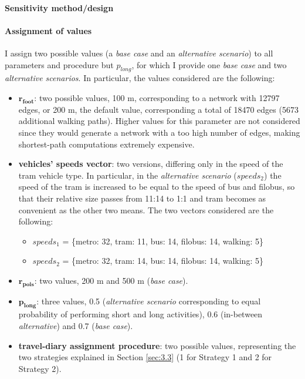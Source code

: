 \paragraph{Sensitivity method/design}


\paragraph{Assignment of values}
I assign two possible values (a \textit{base case} and an \textit{alternative scenario}) to all parameters and procedure but $p_{long}$, for which I provide one \textit{base case} and two \textit{alternative scenarios}. In particular, the values considered are the following:
\begin{itemize}
    \item $\mathbf{r_{foot}}$: two possible values, 100 m, corresponding to a network with 12797 edges, or 200 m, the default value, corresponding a total of 18470 edges (5673 additional walking paths). Higher values for this parameter are not considered since they would generate a network with a too high number of edges, making shortest-path computations extremely expensive.
    \item \textbf{vehicles' speeds vector}: two versions, differing only in the speed of the tram vehicle type. In particular, in the \textit{alternative scenario} ($speeds_2$) the speed of the tram is increased to be equal to the speed of bus and filobus, so that their relative size passes from 11:14 to 1:1 and tram becomes as convenient as the other two means. The two vectors considered are the following:
            \begin{itemize}
                \item $speeds_1$ = \{metro: 32, tram: 11, bus: 14, filobus: 14, walking: 5\}
                \item $speeds_2$ = \{metro: 32, tram: 14, bus: 14, filobus: 14, walking: 5\}
            \end{itemize}
    \item $\mathbf{r_{pois}}$: two values, 200 m and 500 m (\textit{base case}). 
    \item $\mathbf{p_{long}}$: three values, 0.5 (\textit{alternative scenario} corresponding to equal probability of performing short and long activities), 0.6 (in-between \textit{alternative}) and 0.7 (\textit{base case}).
    \item \textbf{travel-diary assignment procedure}: two possible values, representing the two strategies explained in Section \ref{sec:3.3} (1 for Strategy 1 and 2 for Strategy 2).
\end{itemize}

